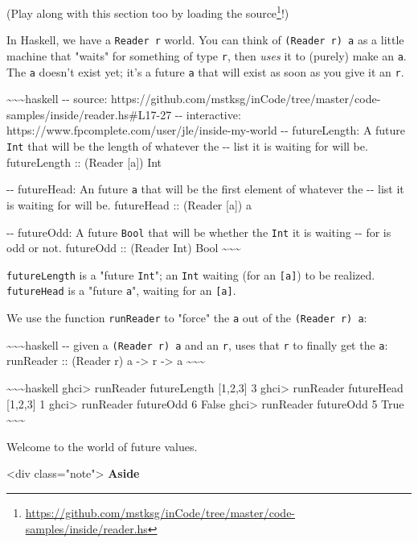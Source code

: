 \documentclass[]{article}
\renewcommand{\href}[2]{#2\footnote{\url{#1}}}
\begin{document}
(Play along with this section too by
\href{https://github.com/mstksg/inCode/tree/master/code-samples/inside/reader.hs}{loading
the source}!)

In Haskell, we have a \texttt{Reader\ r} world. You can think of
\texttt{(Reader\ r)\ a} as a little machine that "waits" for something of type
\texttt{r}, then \emph{uses} it to (purely) make an \texttt{a}. The \texttt{a}
doesn't exist yet; it's a future \texttt{a} that will exist as soon as you give
it an \texttt{r}.

\textasciitilde{}\textasciitilde{}\textasciitilde{}haskell -\/- source:
https://github.com/mstksg/inCode/tree/master/code-samples/inside/reader.hs\#L17-27
-\/- interactive: https://www.fpcomplete.com/user/jle/inside-my-world -\/-
futureLength: A future \texttt{Int} that will be the length of whatever the -\/-
list it is waiting for will be. futureLength :: (Reader {[}a{]}) Int

-\/- futureHead: An future \texttt{a} that will be the first element of whatever
the -\/- list it is waiting for will be. futureHead :: (Reader {[}a{]}) a

-\/- futureOdd: A future \texttt{Bool} that will be whether the \texttt{Int} it
is waiting -\/- for is odd or not. futureOdd :: (Reader Int) Bool
\textasciitilde{}\textasciitilde{}\textasciitilde{}

\texttt{futureLength} is a "future \texttt{Int}"; an \texttt{Int} waiting (for
an \texttt{{[}a{]}}) to be realized. \texttt{futureHead} is a "future
\texttt{a}", waiting for an \texttt{{[}a{]}}.

We use the function \texttt{runReader} to "force" the \texttt{a} out of the
\texttt{(Reader\ r)\ a}:

\textasciitilde{}\textasciitilde{}\textasciitilde{}haskell -\/- given a
\texttt{(Reader\ r)\ a} and an \texttt{r}, uses that \texttt{r} to finally get
the \texttt{a}: runReader :: (Reader r) a -\textgreater{} r -\textgreater{} a
\textasciitilde{}\textasciitilde{}\textasciitilde{}

\textasciitilde{}\textasciitilde{}\textasciitilde{}haskell ghci\textgreater{}
runReader futureLength {[}1,2,3{]} 3 ghci\textgreater{} runReader futureHead
{[}1,2,3{]} 1 ghci\textgreater{} runReader futureOdd 6 False ghci\textgreater{}
runReader futureOdd 5 True \textasciitilde{}\textasciitilde{}\textasciitilde{}

Welcome to the world of future values.

\textless{}div class="note"\textgreater{} \textbf{Aside}
\end{document}
